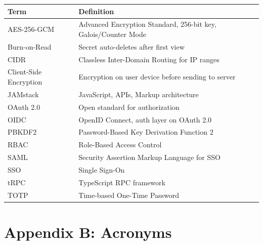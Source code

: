 \documentclass[12pt,a4paper]{article}
\begin{document}
\begin{table}[H]
  \centering
  \small
  \begin{tabular}{@{}p{3.5cm}p{10cm}@{}}
    \toprule
    \textbf{Term}          & \textbf{Definition}                                            \\
    \midrule
    AES-256-GCM            & Advanced Encryption Standard, 256-bit key, Galois/Counter Mode \\
    \hline
    Burn-on-Read           & Secret auto-deletes after first view                           \\
    \hline
    CIDR                   & Classless Inter-Domain Routing for IP ranges                   \\
    \hline
    Client-Side Encryption & Encryption on user device before sending to server             \\
    \hline
    JAMstack               & JavaScript, APIs, Markup architecture                          \\
    \hline
    OAuth 2.0              & Open standard for authorization                                \\
    \hline
    OIDC                   & OpenID Connect, auth layer on OAuth 2.0                        \\
    \hline
    PBKDF2                 & Password-Based Key Derivation Function 2                       \\
    \hline
    RBAC                   & Role-Based Access Control                                      \\
    \hline
    SAML                   & Security Assertion Markup Language for SSO                     \\
    \hline
    SSO                    & Single Sign-On                                                 \\
    \hline
    tRPC                   & TypeScript RPC framework                                       \\
    \hline
    TOTP                   & Time-based One-Time Password                                   \\
    \bottomrule
  \end{tabular}
\end{table}

\section*{Appendix B: Acronyms}
\end{document}
